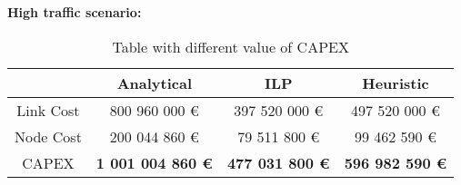 \vspace{11pt}
\textbf{High traffic scenario:}\\

\begin{table}[h!]
\centering
\begin{tabular}{| c | c | c | c |}
 \hline
   & Analytical & ILP & Heuristic \\
 \hline\hline
 Link Cost & 800 960 000 \euro & 397 520 000 \euro & 497 520 000 \euro \\
 Node Cost & 200 044 860 \euro & 79 511 800 \euro & 99 462 590 \euro \\
 CAPEX & \textbf{1 001 004 860 \euro} & \textbf{477 031 800 \euro} & \textbf{596 982 590 \euro} \\
 \hline
\end{tabular}
\caption{Table with different value of CAPEX }
\label{table_comparative_opaque_protec_ref_3}
\end{table}

